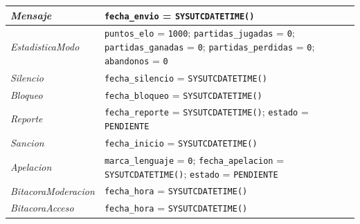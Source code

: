 \begin{center}
\begin{longtable}{|L{0.22\textwidth}|L{0.68\textwidth}|}
\textit{Mensaje} & \texttt{fecha\_\allowbreak{}envio} = \texttt{SYSUTCDATETIME()} \\ \hline
\textit{Estadistica\-Modo} & \texttt{puntos\_\allowbreak{}elo} = \texttt{1000}; \texttt{partidas\_\allowbreak{}jugadas} = \texttt{0}; \texttt{partidas\_\allowbreak{}ganadas} = \texttt{0}; \texttt{partidas\_\allowbreak{}perdidas} = \texttt{0}; \texttt{abandonos} = \texttt{0} \\ \hline
\textit{Silencio} & \texttt{fecha\_\allowbreak{}silencio} = \texttt{SYSUTCDATETIME()} \\ \hline
\textit{Bloqueo} & \texttt{fecha\_\allowbreak{}bloqueo} = \texttt{SYSUTCDATETIME()} \\ \hline
\textit{Reporte} & \texttt{fecha\_\allowbreak{}reporte} = \texttt{SYSUTCDATETIME()}; \texttt{estado} = \texttt{\textquotesingle{}PENDIENTE\textquotesingle{}} \\ \hline
\textit{Sancion} & \texttt{fecha\_\allowbreak{}inicio} = \texttt{SYSUTCDATETIME()} \\ \hline
\textit{Apelacion} & \texttt{marca\_\allowbreak{}lenguaje} = \texttt{0}; \texttt{fecha\_\allowbreak{}apelacion} = \texttt{SYSUTCDATETIME()}; \texttt{estado} = \texttt{\textquotesingle{}PENDIENTE\textquotesingle{}} \\ \hline
\textit{Bitacora\-Moderacion} & \texttt{fecha\_\allowbreak{}hora} = \texttt{SYSUTCDATETIME()} \\ \hline
\textit{Bitacora\-Acceso} & \texttt{fecha\_\allowbreak{}hora} = \texttt{SYSUTCDATETIME()} \\ \hline
\end{longtable}
\end{center}
